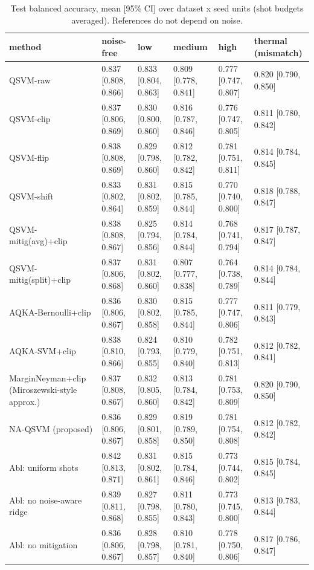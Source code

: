 \begin{table}[t]
\centering
\caption{Test balanced accuracy, mean [95\% CI] over dataset x seed units (shot budgets averaged). References do not depend on noise.}
\label{tab:bacc_noise}
\small
\begin{tabular}{llllll}
\hline
method & noise-free & low & medium & high & thermal (mismatch) \\
\hline
QSVM-raw & 0.837 [0.808, 0.866] & 0.833 [0.804, 0.863] & 0.809 [0.778, 0.841] & 0.777 [0.747, 0.807] & 0.820 [0.790, 0.850] \\
QSVM-clip & 0.837 [0.806, 0.869] & 0.830 [0.800, 0.860] & 0.816 [0.787, 0.846] & 0.776 [0.747, 0.805] & 0.811 [0.780, 0.842] \\
QSVM-flip & 0.838 [0.808, 0.869] & 0.829 [0.798, 0.860] & 0.812 [0.782, 0.842] & 0.781 [0.751, 0.811] & 0.814 [0.784, 0.845] \\
QSVM-shift & 0.833 [0.802, 0.864] & 0.831 [0.802, 0.859] & 0.815 [0.785, 0.844] & 0.770 [0.740, 0.800] & 0.818 [0.788, 0.847] \\
QSVM-mitig(avg)+clip & 0.838 [0.808, 0.867] & 0.825 [0.794, 0.856] & 0.814 [0.784, 0.844] & 0.768 [0.741, 0.794] & 0.817 [0.787, 0.847] \\
QSVM-mitig(split)+clip & 0.837 [0.806, 0.868] & 0.831 [0.802, 0.860] & 0.807 [0.777, 0.838] & 0.764 [0.738, 0.789] & 0.814 [0.784, 0.844] \\
AQKA-Bernoulli+clip & 0.836 [0.806, 0.867] & 0.830 [0.802, 0.858] & 0.815 [0.785, 0.844] & 0.777 [0.747, 0.806] & 0.811 [0.779, 0.843] \\
AQKA-SVM+clip & 0.838 [0.810, 0.866] & 0.824 [0.793, 0.855] & 0.810 [0.779, 0.840] & 0.782 [0.751, 0.813] & 0.812 [0.782, 0.841] \\
MarginNeyman+clip (Miroszewski-style approx.) & 0.837 [0.808, 0.867] & 0.832 [0.805, 0.860] & 0.813 [0.784, 0.842] & 0.781 [0.753, 0.809] & 0.820 [0.790, 0.850] \\
NA-QSVM (proposed) & 0.836 [0.806, 0.867] & 0.829 [0.801, 0.858] & 0.819 [0.789, 0.850] & 0.781 [0.754, 0.808] & 0.812 [0.782, 0.842] \\
Abl: uniform shots & 0.842 [0.813, 0.871] & 0.831 [0.802, 0.861] & 0.815 [0.784, 0.846] & 0.773 [0.744, 0.802] & 0.815 [0.784, 0.845] \\
Abl: no noise-aware ridge & 0.839 [0.811, 0.868] & 0.827 [0.798, 0.855] & 0.811 [0.780, 0.843] & 0.773 [0.745, 0.800] & 0.813 [0.783, 0.844] \\
Abl: no mitigation & 0.836 [0.806, 0.867] & 0.828 [0.798, 0.857] & 0.810 [0.781, 0.840] & 0.778 [0.750, 0.806] & 0.817 [0.786, 0.847] \\

\end{tabular}
\end{table}
